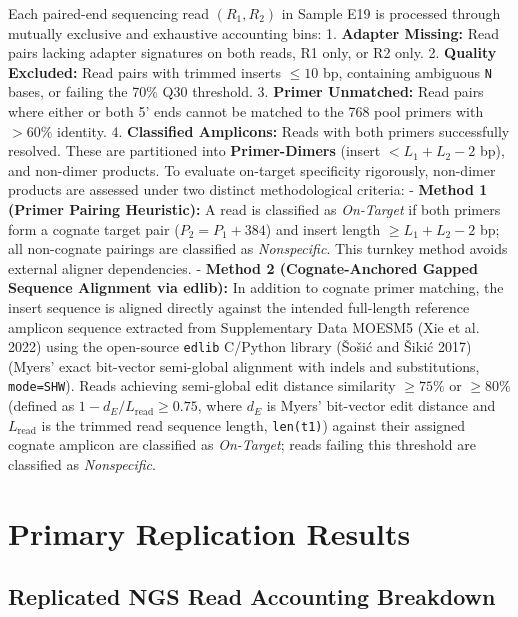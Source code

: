 \documentclass[
]{article}
\begin{document}
Each paired-end sequencing read \((R_1, R_2)\) in Sample E19 is
processed through mutually exclusive and exhaustive accounting bins: 1.
\textbf{Adapter Missing:} Read pairs lacking adapter signatures on both
reads, R1 only, or R2 only. 2. \textbf{Quality Excluded:} Read pairs
with trimmed inserts \(\le 10\) bp, containing ambiguous
\texttt{\textquotesingle{}N\textquotesingle{}} bases, or failing the
70\% Q30 threshold. 3. \textbf{Primer Unmatched:} Read pairs where
either or both 5' ends cannot be matched to the 768 pool primers with
\(>60\%\) identity. 4. \textbf{Classified Amplicons:} Reads with both
primers successfully resolved. These are partitioned into
\textbf{Primer-Dimers} (insert \(< L_1 + L_2 - 2\) bp), and non-dimer
products. To evaluate on-target specificity rigorously, non-dimer
products are assessed under two distinct methodological criteria: -
\textbf{Method 1 (Primer Pairing Heuristic):} A read is classified as
\emph{On-Target} if both primers form a cognate target pair
(\(P_2 = P_1 + 384\)) and insert length \(\ge L_1 + L_2 - 2\) bp; all
non-cognate pairings are classified as \emph{Nonspecific}. This turnkey
method avoids external aligner dependencies. - \textbf{Method 2
(Cognate-Anchored Gapped Sequence Alignment via edlib):} In addition to
cognate primer matching, the insert sequence is aligned directly against
the intended full-length reference amplicon sequence extracted from
Supplementary Data MOESM5 (Xie et al. 2022) using the open-source
\texttt{edlib} C/Python library (Šošić and Šikić 2017) (Myers' exact
bit-vector semi-global alignment with indels and substitutions,
\texttt{mode=\textquotesingle{}SHW\textquotesingle{}}). Reads achieving
semi-global edit distance similarity \(\ge 75\%\) or \(\ge 80\%\)
(defined as \(1 - d_E / L_{\text{read}} \ge 0.75\), where \(d_E\) is
Myers' bit-vector edit distance and \(L_{\text{read}}\) is the trimmed
read sequence length, \texttt{len(t1)}) against their assigned cognate
amplicon are classified as \emph{On-Target}; reads failing this
threshold are classified as \emph{Nonspecific}.

\section{Primary Replication Results}\label{primary-replication-results}

\subsection{Replicated NGS Read Accounting
Breakdown}\label{replicated-ngs-read-accounting-breakdown}
\end{document}
